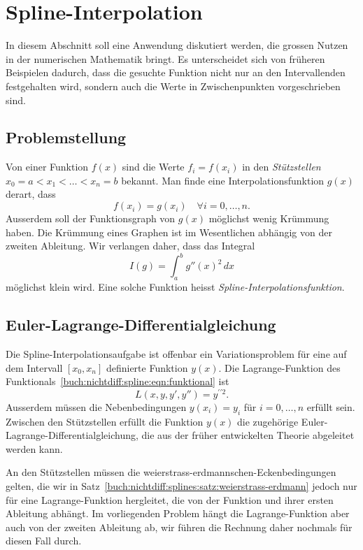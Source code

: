 %
%
%
\section{Spline-Interpolation
\label{buch:nichtdiff:section:splines}}
In diesem Abschnitt soll eine Anwendung diskutiert werden, die grossen
Nutzen in der numerischen Mathematik bringt.
Es unterscheidet sich von früheren Beispielen dadurch, dass die
gesuchte Funktion nicht nur an den Intervallenden festgehalten wird,
sondern auch die Werte in Zwischenpunkten vorgeschrieben sind.

%
%
\subsection{Problemstellung}
Von einer Funktion $f(x)$ sind die Werte 
$f_i=f(x_i)$ in den {\em Stützstellen} $x_0=a<x_1<\dots<x_n=b$ bekannt.
%
Man finde eine Interpolationsfunktion $g(x)$ derart, dass
\[
f(x_i) = g(x_i)
\quad
\forall i=0,\dots,n.
\]
Ausserdem soll der Funktionsgraph von $g(x)$ möglichst wenig Krümmung haben.
Die Krümmung eines Graphen ist im Wesentlichen abhängig von der zweiten
Ableitung.
Wir verlangen daher, dass das Integral
\begin{equation}
I(g)
=
\int_a^b g''(x)^2\,dx
\label{buch:nichtdiff:spline:eqn:funktional}
\end{equation}
möglichst klein wird.
Eine solche Funktion heisst {\em Spline-Interpolationsfunktion}.
%

%
%
\subsection{Euler-Lagrange-Differentialgleichung}
Die Spline-Interpolationsaufgabe ist offenbar ein Variationsproblem
für eine auf dem Intervall $[x_0,x_n]$ definierte Funktion $y(x)$.
Die Lagrange-Funktion des
Funktionals~\eqref{buch:nichtdiff:spline:eqn:funktional} ist
\[
L(x,y,y',y'') = y^{\prime\prime 2}.
\]
Ausserdem müssen die Nebenbedingungen $y(x_i)=y_i$ für $i=0,\dots,n$
erfüllt sein.
Zwischen den Stützstellen erfüllt die Funktion $y(x)$ die zugehörige
Euler-Lagrange-Differential\-glei\-chung, die aus der früher entwickelten
Theorie abgeleitet werden kann.

An den Stützstellen müssen die weierstrass-erdmannschen-Eckenbedingungen
gelten, die wir in Satz~\ref{buch:nichtdiff:splines:satz:weierstrass-erdmann}
jedoch nur für eine Lagrange-Funktion hergleitet, die von der Funktion
und ihrer ersten Ableitung abhängt.
Im vorliegenden Problem hängt die Lagrange-Funktion aber auch von der
zweiten Ableitung ab, wir führen die Rechnung daher nochmals für diesen
Fall durch.

